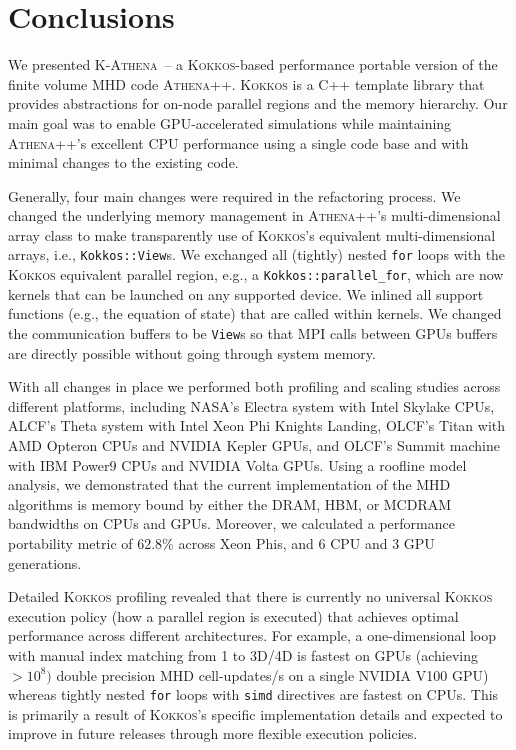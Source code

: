 \documentclass[10pt,journal,compsoc]{IEEEtran}
\newcommand{\textcode}[1]{\textsc{#1}}
\newcommand{\kokkos}{\textcode{Kokkos}\xspace}
\newcommand{\athena}{\textcode{Athena++}\xspace}
\newcommand{\kathena}{\textcode{K-Athena}\xspace}
\newcommand{\mpi}{\textcode{MPI}\xspace}
\begin{document}
\section{Conclusions}
\label{sec:conclusions}

We presented \kathena~-- a \kokkos-based performance portable version of the finite 
volume MHD code \athena.
\kokkos is a C++ template library that provides abstractions for on-node
parallel regions and the memory hierarchy.
Our main goal was to enable GPU-accelerated simulations while maintaining \athena's
excellent CPU performance using a single code base and with minimal changes to the
existing code.

Generally, four main changes were required in the refactoring process.
We changed the underlying memory management in \athena's multi-dimensional array class
to make transparently use of \kokkos's equivalent multi-dimensional arrays, i.e.,
\verb=Kokkos::View=s.
We exchanged all (tightly) nested \verb=for= loops with the \kokkos equivalent
parallel region, e.g., a \verb=Kokkos::parallel_for=, which are now kernels that
can be launched on any supported device.
We inlined all support functions (e.g., the equation of state) that are called within 
kernels.
We changed the communication buffers to be \verb=View=s so that \mpi calls between GPUs
buffers are directly possible without going through system memory.

With all changes in place we performed both profiling and scaling studies 
across different platforms, including NASA's Electra system with Intel Skylake CPUs,
ALCF's Theta system with Intel Xeon Phi Knights Landing, OLCF's Titan with AMD 
Opteron CPUs and NVIDIA Kepler GPUs, and OLCF's Summit machine with IBM Power9 CPUs
and NVIDIA Volta GPUs.
Using a roofline model analysis, we demonstrated that the current implementation of the
MHD algorithms is memory bound by either the DRAM, HBM, or MCDRAM bandwidths on CPUs and GPUs.
Moreover, we calculated a performance portability metric of 62.8\% across Xeon Phis, and
6 CPU and 3 GPU generations.

Detailed \kokkos profiling revealed that there is currently no universal \kokkos
execution policy (how a parallel region is executed) 
that achieves optimal performance across different architectures.
For example, a one-dimensional loop with manual index matching from 1 to 3D/4D is
fastest on GPUs (achieving $>10^8)$ double precision MHD cell-updates/s on a single 
NVIDIA V100 GPU) whereas tightly nested \verb=for= loops with \verb=simd= directives
are fastest on CPUs.
This is primarily a result of \kokkos's specific implementation details
and expected to improve in future releases through more flexible execution policies.
\end{document}
